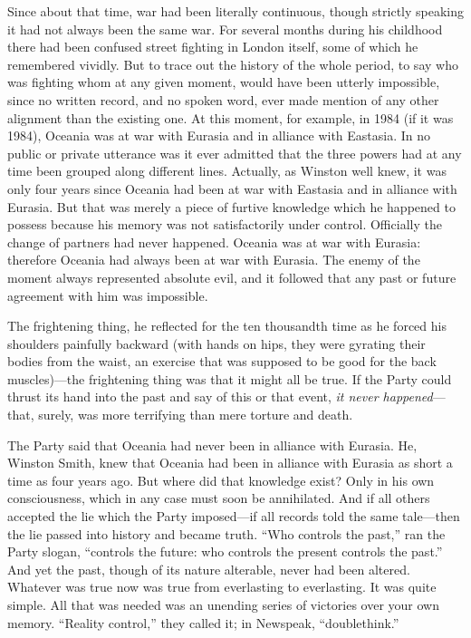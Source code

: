 Since about that time, war had been literally continuous, though
strictly speaking it had not always been the same war. For several
months during his childhood there had been confused street fighting in
London itself, some of which he remembered vividly. But to trace out the
history of the whole period, to say who was fighting whom at any given
moment, would have been utterly impossible, since no written record, and
no spoken word, ever made mention of any other alignment than the
existing one. At this moment, for example, in 1984 (if it was 1984),
Oceania was at war with Eurasia and in alliance with Eastasia. In no
public or private utterance was it ever admitted that the three powers
had at any time been grouped along different lines. Actually, as Winston
well knew, it was only four years since Oceania had been at war with
Eastasia and in alliance with Eurasia. But that was merely a piece of
furtive knowledge which he happened to possess because his memory was
not satisfactorily under control. Officially the change of partners had
never happened. Oceania was at war with Eurasia: therefore Oceania had
always been at war with Eurasia. The enemy of the moment always
represented absolute evil, and it followed that any past or future
agreement with him was impossible.

The frightening thing, he reflected for the ten thousandth time as he
forced his shoulders painfully backward (with hands on hips, they were
gyrating their bodies from the waist, an exercise that was supposed to
be good for the back muscles)---the frightening thing was that it might
all be true. If the Party could thrust its hand into the past and say of
this or that event, \emph{it never happened}---that, surely, was more
terrifying than mere torture and death.

The Party said that Oceania had never been in alliance with Eurasia. He,
Winston Smith, knew that Oceania had been in alliance with Eurasia as
short a time as four years ago. But where did that knowledge exist? Only
in his own consciousness, which in any case must soon be annihilated.
And if all others accepted the lie which the Party imposed---if all
records told the same tale---then the lie passed into history and became
truth. ``Who controls the past,'' ran the Party slogan, ``controls the
future: who controls the present controls the past.'' And yet the past,
though of its nature alterable, never had been altered. Whatever was
true now was true from everlasting to everlasting. It was quite simple.
All that was needed was an unending series of victories over your own
memory. ``Reality control,'' they called it; in Newspeak, ``doublethink.''

